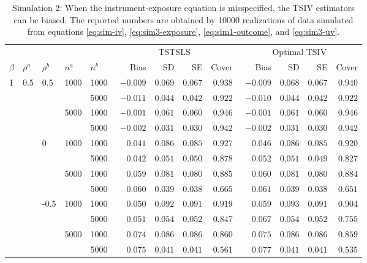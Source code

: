 \documentclass[preprint]{imsart}
\begin{document}
\begin{table}[t]
  \caption{Simulation 2: When the instrument-exposure equation is misspecified, the
    TSIV estimators can be biased. The reported numbers are obtained by 10000 realizations
    of data simulated from equations \eqref{eq:sim-iv},
    \eqref{eq:sim3-exposure}, \eqref{eq:sim1-outcome}, and
    \eqref{eq:sim3-uv}.}
  \label{tab:sim2}
  \centering
  \begin{tabular}{|lllll|rrrr|rrrr|}
    \hline
    & & & & & \multicolumn{4}{c|}{TSTSLS} &
    \multicolumn{4}{c|}{Optimal TSIV} \\
    $\beta$ & $\rho^a$ & $\rho^b$ & $n^a$ & $n^b$ & Bias & SD & SE & Cover &
    Bias & SD & SE & Cover \\
    \hline
    1 & 0.5 & 0.5 & 1000 & 1000  & $-0.009$ & $0.069$ & $0.067$ & $0.938$ & $-0.009$ & $0.068$ & $0.067$ & $0.940$ \\
    &  &  &  & 5000  & $-0.011$ & $0.044$ & $0.042$ & $0.922$ & $-0.010$ & $0.044$ & $0.042$ & $0.922$ \\
    &  &  & 5000 & 1000  & $-0.001$ & $0.061$ & $0.060$ & $0.946$ & $-0.001$ & $0.061$ & $0.060$ & $0.946$ \\
    &  &  &  & 5000  & $-0.002$ & $0.031$ & $0.030$ & $0.942$ & $-0.002$ & $0.031$ & $0.030$ & $0.942$ \\
    &  & 0 & 1000 & 1000  & $\phantom{-}0.041$ & $0.086$ & $0.085$ & $0.927$ & $\phantom{-}0.046$ & $0.086$ & $0.085$ & $0.920$ \\
    &  &  &  & 5000  & $\phantom{-}0.042$ & $0.051$ & $0.050$ & $0.878$ & $\phantom{-}0.052$ & $0.051$ & $0.049$ & $0.827$ \\
    &  &  & 5000 & 1000  & $\phantom{-}0.059$ & $0.081$ & $0.080$ & $0.885$ & $\phantom{-}0.060$ & $0.081$ & $0.080$ & $0.884$ \\
    &  &  &  & 5000  & $\phantom{-}0.060$ & $0.039$ & $0.038$ & $0.665$ & $\phantom{-}0.061$ & $0.039$ & $0.038$ & $0.651$ \\
    &  & -0.5 & 1000 & 1000  & $\phantom{-}0.050$ & $0.092$ & $0.091$ & $0.919$ & $\phantom{-}0.059$ & $0.093$ & $0.091$ & $0.904$ \\
    &  &  &  & 5000  & $\phantom{-}0.051$ & $0.054$ & $0.052$ & $0.847$ & $\phantom{-}0.067$ & $0.054$ & $0.052$ & $0.755$ \\
    &  &  & 5000 & 1000  & $\phantom{-}0.074$ & $0.086$ & $0.086$ & $0.860$ & $\phantom{-}0.075$ & $0.086$ & $0.086$ & $0.859$ \\
    &  &  &  & 5000  & $\phantom{-}0.075$ & $0.041$ & $0.041$ & $0.561$ & $\phantom{-}0.077$ & $0.041$ & $0.041$ & $0.535$ \\    \hline
  \end{tabular}
\end{table}
\end{document}
